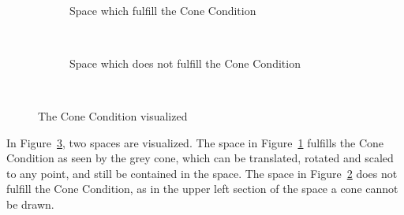 \iffalse
\begin{defn}{Cone Condition}
    Let $E$ be a Euclidean space and let $G$ be an open subset of $E$.
    Let $\varepsilon >0$, and define 
    $V(w, l)$ to be a cone with vertex at origo, opening $\varepsilon$, axis $w$,
    and height $l$.
    Also define $\mathcal{E} = \{e(g) | g \in G, \, e(g) \text{ is a straight line}\}$ 
    to be the set of all possible straight lines going through each point in $G$. %
    The cone condition is defined to be: %
    \begin{equation*}
        \exists h \leq \infty \,\,
        \forall x \in G\,\, \exists e\in \mathcal{E} \,\, :
        x + V(e(x), h) \subset G. %
    \end{equation*}
    This means: at all points in $G$, we can create a cone with positive opening,
    with some height, pointing in some direction, such that the cone is contained 
    in $G$.
\end{defn}
\fi
\begin{figure}[H]
    \centering
    \begin{subfigure}{.3\textwidth}
        \centering
        
        \caption{Space which fulfill the Cone Condition}~\label{fig:cone_condition_true}
      \end{subfigure}
    \begin{subfigure}{.3\textwidth}
        \centering
        
        \caption{Space which does not fulfill the Cone Condition}~\label{fig:cone_condition_false}
      \end{subfigure}
      \caption{The Cone Condition visualized}~\label{fig:cone_condition_visu}
\end{figure}
In Figure~\ref{fig:cone_condition_visu}, two spaces are visualized.
 The space in Figure~\ref{fig:cone_condition_true} fulfills the Cone Condition as seen 
 by the grey cone, which can be translated, rotated and scaled to any point, and still 
 be contained in the space. The space  
 in Figure~\ref{fig:cone_condition_false} does not fulfill the Cone Condition, as
in the upper left section of the space a cone cannot be drawn.

